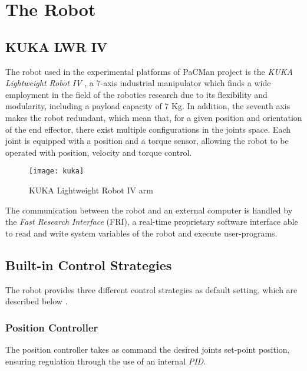 \section{The Robot}\label{sec:therobot}
\subsection{KUKA LWR IV}

The robot used in the experimental platforms of PaCMan project is the \textit{KUKA Lightweight Robot IV} \cite{webkuka},  a 7-axis industrial manipulator which finds a wide employment in the field of the robotics research due to its flexibility and modularity, including a payload capacity of 7 Kg. In addition, the seventh axis makes the robot redundant, which mean that, for a given position and orientation of the end effector, there exist multiple configurations in the joints space. Each joint is equipped with a position and a torque sensor, allowing the robot to be operated with position, velocity and torque control. 

\begin{figure}[h]
\centering
\texttt{[image: kuka]}
\caption{KUKA Lightweight Robot IV arm}
\end{figure}

The communication between the robot and an external computer is handled by the \textit{Fast Research Interface} (FRI), a real-time proprietary software interface able to read and write system variables of the robot and execute user-programs.

\subsection{Built-in Control Strategies}
The robot provides three different control strategies as default setting, which are described below \cite{kukafri}.
\subsubsection*{Position Controller}
The position controller takes as command the desired joints set-point position, ensuring regulation through the use of an internal \textit{PID}. 

